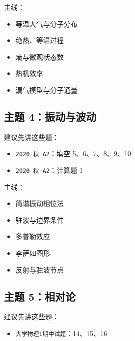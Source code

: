 \documentclass[12pt,a4paper]{ctexart}
\begin{document}
主线：

\begin{itemize}

\item 等温大气与分子分布

\item 绝热、等温过程

\item 熵与微观状态数

\item 热机效率

\item 漏气模型与分子通量

\end{itemize}

\subsection{主题 4：振动与波动}

建议先讲这些题：

\begin{itemize}

\item \texttt{2020 秋 A2}：填空 5、6、7、8、9、10

\item \texttt{2020 秋 A2}：计算题 1

\end{itemize}

主线：

\begin{itemize}

\item 简谐振动相位法

\item 驻波与边界条件

\item 多普勒效应

\item 李萨如图形

\item 反射与驻波节点

\end{itemize}

\subsection{主题 5：相对论}

建议先讲这些题：

\begin{itemize}

\item \texttt{大学物理1期中试题}：14、15、16

\end{itemize}
\end{document}
